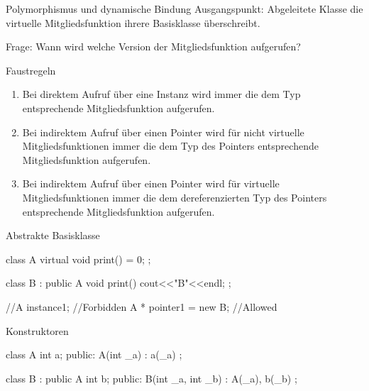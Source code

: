 \ifnum\conditionmacro=1 \documentclass[handout,usenames,dvipsnames]{beamer}\fi
\begin{document}
\begin{frame}{Polymorphismus und dynamische Bindung}
Ausgangspunkt: Abgeleitete Klasse die virtuelle Mitgliedsfunktion ihrere Basisklasse überschreibt.

Frage: Wann wird welche Version der Mitgliedsfunktion aufgerufen?
\begin{block}{Faustregeln}
\begin{enumerate}
\item Bei direktem Aufruf über eine Instanz wird immer die dem Typ entsprechende Mitgliedsfunktion aufgerufen.
\item Bei indirektem Aufruf über einen Pointer wird für nicht virtuelle Mitgliedsfunktionen immer die dem Typ des Pointers entsprechende Mitgliedsfunktion aufgerufen.
\item Bei indirektem Aufruf über einen Pointer wird für virtuelle Mitgliedsfunktionen immer die dem dereferenzierten Typ des Pointers entsprechende Mitgliedsfunktion aufgerufen.
\end{enumerate}
\end{block}
\end{frame}

\begin{frame}[fragile]{Abstrakte Basisklasse}
\begin{TFCpp}
class A {
	virtual void print() = 0;
};

class B : public A {
	void print()
	{cout<<"B"<<endl;}
};

//A instance1; //Forbidden
A * pointer1 = new B; //Allowed
\end{TFCpp}
\end{frame}


\begin{frame}[fragile]{Konstruktoren}
\begin{TFCpp}
class A {
	int a;
public:
	A(int _a) : a(_a){}
};

class B : public A {
	int b;
public:
	B(int _a, int _b) : A(_a), b(_b) {}
};
\end{TFCpp}
\end{frame}

\end{document}

